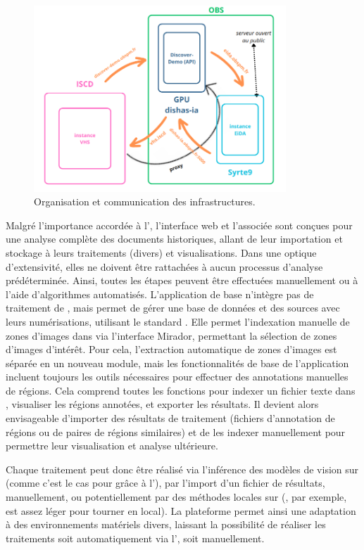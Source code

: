           \begin{figure}[H]
	\begin{center}
		\includegraphics[height=7cm]{figues/com_hard_ware.png}
	\end{center}
	\caption{Organisation et communication des infrastructures.}
	\label{fig:com} \end{figure}

Malgré l'importance accordée à l'\ia,
l'interface web et l'\api associée sont conçues pour une analyse complète
des documents historiques, allant de leur importation et stockage à
leurs traitements (divers) et visualisations. Dans une optique
d'extensivité, elles ne doivent être rattachées à aucun processus d'analyse
prédéterminée. Ainsi, toutes les étapes peuvent être
effectuées manuellement ou à l'aide d'algorithmes automatisés.
L'application de base n'intègre pas de traitement de \cv, mais permet de gérer une base de données et des sources avec
leurs numérisations, utilisant le standard \iiif. Elle permet
l'indexation manuelle de zones d'images dans \sas via l'interface Mirador,
permettant la sélection de zones d'images d'intérêt. Pour cela,
l'extraction automatique de zones d'images est séparée en un nouveau
module, mais les fonctionnalités de base de l'application incluent
toujours les outils nécessaires pour effectuer des annotations manuelles
de régions. Cela comprend toutes les fonctions pour indexer un fichier
texte dans \sas, visualiser les régions annotées, et exporter les
résultats. Il devient alors envisageable d'importer des résultats de traitement
(fichiers d'annotation de régions ou de paires de régions similaires) et
de les indexer manuellement pour permettre leur visualisation et analyse
ultérieure.

Chaque traitement peut donc être
réalisé via l'inférence des modèles de vision sur \gpu (comme c'est le
cas pour \eida grâce à l'\api), par l'import d'un fichier de résultats,
manuellement, ou potentiellement par des méthodes locales sur \cpu
(\yolov, par exemple, est assez léger pour tourner en local). La
plateforme permet ainsi une adaptation à des environnements matériels
divers, laissant la possibilité de réaliser les traitements soit
automatiquement via l'\ia, soit manuellement.

